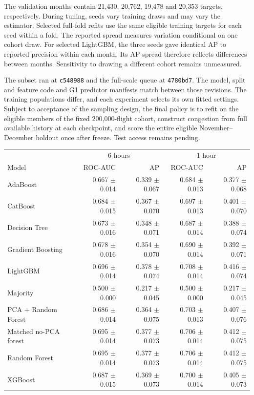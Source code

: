 \documentclass{article}
\begin{document}
The validation months contain 21,430, 20,762, 19,478 and 20,353 targets, respectively. During tuning, seeds vary training draws and may vary the estimator. Selected full-fold refits use the same eligible training targets for each seed within a fold. The reported spread measures variation conditional on one cohort draw. For selected LightGBM, the three seeds gave identical AP to reported precision within each month. Its AP spread therefore reflects differences between months. Sensitivity to drawing a different cohort remains unmeasured.

The subset ran at \texttt{c548988} and the full-scale queue at \texttt{4780bd7}. The model, split and feature code and G1 predictor manifests match between those revisions. The training populations differ, and each experiment selects its own fitted settings. Subject to acceptance of the sampling design, the final policy is to refit on the eligible members of the fixed 200,000-flight cohort, construct congestion from full available history at each checkpoint, and score the entire eligible November--December holdout once after freeze. Test access remains pending.
\begin{center}\small
\begin{tabular}{lrrrr}\toprule
 & \multicolumn{2}{c}{6 hours} & \multicolumn{2}{c}{1 hour} \\
Model & ROC-AUC & AP & ROC-AUC & AP \\\midrule
AdaBoost & 0.667 $\pm$ 0.014 & 0.339 $\pm$ 0.067 & 0.684 $\pm$ 0.013 & 0.377 $\pm$ 0.068 \\
CatBoost & 0.684 $\pm$ 0.015 & 0.367 $\pm$ 0.070 & 0.697 $\pm$ 0.013 & 0.401 $\pm$ 0.070 \\
Decision Tree & 0.673 $\pm$ 0.016 & 0.348 $\pm$ 0.071 & 0.687 $\pm$ 0.014 & 0.388 $\pm$ 0.074 \\
Gradient Boosting & 0.678 $\pm$ 0.016 & 0.354 $\pm$ 0.070 & 0.690 $\pm$ 0.014 & 0.392 $\pm$ 0.071 \\
LightGBM & 0.696 $\pm$ 0.014 & 0.378 $\pm$ 0.074 & 0.708 $\pm$ 0.014 & 0.416 $\pm$ 0.074 \\
Majority & 0.500 $\pm$ 0.000 & 0.217 $\pm$ 0.045 & 0.500 $\pm$ 0.000 & 0.217 $\pm$ 0.045 \\
PCA + Random Forest & 0.686 $\pm$ 0.014 & 0.364 $\pm$ 0.075 & 0.703 $\pm$ 0.013 & 0.407 $\pm$ 0.076 \\
Matched no-PCA forest & 0.695 $\pm$ 0.014 & 0.377 $\pm$ 0.073 & 0.706 $\pm$ 0.014 & 0.412 $\pm$ 0.075 \\
Random Forest & 0.695 $\pm$ 0.014 & 0.377 $\pm$ 0.073 & 0.706 $\pm$ 0.014 & 0.412 $\pm$ 0.075 \\
XGBoost & 0.687 $\pm$ 0.015 & 0.369 $\pm$ 0.073 & 0.700 $\pm$ 0.014 & 0.405 $\pm$ 0.073 \\
\bottomrule\end{tabular}\end{center}
\end{document}
